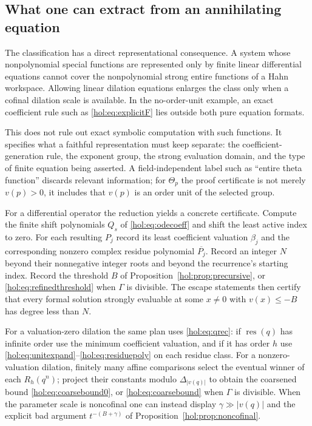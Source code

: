 \documentclass[11pt]{article}
\numberwithin{equation}{section}
\theoremstyle{definition}
\theoremstyle{remark}
\newcommand{\res}{\operatorname{res}}
\newcommand{\abs}[1]{\lvert#1\rvert}
\begin{document}
\subsection{What one can extract from an annihilating equation}

The classification has a direct representational consequence. A system whose
nonpolynomial special functions are represented only by finite linear
differential equations cannot cover the nonpolynomial strong entire functions
of a Hahn workspace. Allowing linear dilation equations enlarges the class only
when a cofinal dilation scale is available. In the no-order-unit example, an
exact coefficient rule such as \eqref{hol:eq:explicitF} lies outside both pure
equation formats.

This does not rule out exact symbolic computation with such functions. It
specifies what a faithful representation must keep separate: the
coefficient-generation rule, the exponent group, the strong evaluation domain,
and the type of finite equation being asserted. A field-independent label such
as ``entire theta function'' discards relevant information; for $\Theta_p$ the
proof certificate is not merely $v(p)>0$, it includes that $v(p)$ is an order
unit of the selected group.

For a differential operator the reduction yields a concrete certificate.
Compute the finite shift polynomials $Q_s$ of \eqref{hol:eq:odecoeff} and
shift the least active index to zero. For each resulting $P_j$ record its
least coefficient valuation $\beta_j$ and the corresponding nonzero complex
residue polynomial $\overline{P_j}$. Record an integer $N$ beyond their
nonnegative integer roots and beyond the recurrence's starting index. Record
the threshold $B$ of Proposition~\ref{hol:prop:precursive}, or
\eqref{hol:eq:refinedthreshold} when $\Gamma$ is divisible. The escape
statements then certify that every formal solution strongly evaluable at some
$x\ne0$ with $v(x)\le-B$ has degree less than $N$.

For a valuation-zero dilation the same plan uses \eqref{hol:eq:qrec}: if
$\res(q)$ has infinite order use the minimum coefficient valuation, and if it
has order $h$ use \eqref{hol:eq:unitexpand}--\eqref{hol:eq:residuepoly} on
each residue class. For a nonzero-valuation dilation, finitely many affine
comparisons select the eventual winner of each $R_h(q^n)$; project their
constants modulo $\Delta_{\abs{v(q)}}$ to obtain the coarsened bound
\eqref{hol:eq:coarsebound0}, or \eqref{hol:eq:coarsebound} when $\Gamma$ is
divisible. When the parameter scale is noncofinal one can instead display
$\gamma\gg\abs{v(q)}$ and the explicit bad argument $t^{-(B+\gamma)}$ of
Proposition~\ref{hol:prop:noncofinal}.
\end{document}
